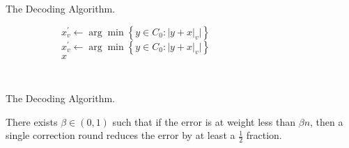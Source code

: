 \documentclass{beamer}
\begin{document}
\begin{frame}{The Decoding Algorithm.}

  
  \begin{figure}[h]
    \begin{subfigure}[h]{0.4\textwidth}

    \label{alg:three}
      \begin{algorithm}[H]
     {
      $x^{\prime}_{v} \leftarrow \arg\min {\left\{  y \in C_{0} : |y + x|_{v} |  \right\} } $\\
    }
     {
      $x^{\prime}_{v} \leftarrow \arg\min {\left\{  y \in C_{0} : |y + x|_{v} |  \right\} } $\\
    }
    \Return  $x $

  \end{algorithm}
    \end{subfigure}
    \begin{subfigure}[h]{0.1\textwidth}
      \
    \end{subfigure}
    \begin{subfigure}[h]{0.45\textwidth} 

    \label{fig:location}
    \end{subfigure} 
  \end{figure}

\end{frame}
\begin{frame}{The Decoding Algorithm.}

  \begin{lemma}
    \label{lemma:reduce}
There exists $\beta \in (0,1)$ such that if the error is at weight less than $\beta n$, then a single correction round reduces the error by at least a $\frac{1}{2}$ fraction.
  \end{lemma}

\end{frame}
\end{document}
